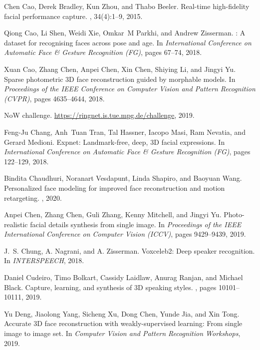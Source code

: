 \documentclass[final]{cvpr}
\begin{document}
{\begin{thebibliography}{10}
Chen Cao, Derek Bradley, Kun Zhou, and Thabo Beeler.
\newblock Real-time high-fidelity facial performance capture.
, 34(4):1--9, 2015.

Qiong Cao, Li Shen, Weidi Xie, Omkar~M Parkhi, and Andrew Zisserman.
: A dataset for recognising faces across pose and age.
\newblock In {\em International Conference on Automatic Face \& Gesture
  Recognition (FG)}, pages 67--74, 2018.

Xuan Cao, Zhang Chen, Anpei Chen, Xin Chen, Shiying Li, and Jingyi Yu.
\newblock Sparse photometric {3D} face reconstruction guided by morphable
  models.
\newblock In {\em Proceedings of the IEEE Conference on Computer Vision and
  Pattern Recognition (CVPR)}, pages 4635--4644, 2018.

NoW challenge.
\newblock \url{https://ringnet.is.tue.mpg.de/challenge}, 2019.

Feng-Ju Chang, Anh~Tuan Tran, Tal Hassner, Iacopo Masi, Ram Nevatia, and Gerard
  Medioni.
\newblock Expnet: Landmark-free, deep, {3D} facial expressions.
\newblock In {\em International Conference on Automatic Face \& Gesture
  Recognition (FG)}, pages 122--129, 2018.

Bindita Chaudhuri, Noranart Vesdapunt, Linda Shapiro, and Baoyuan Wang.
\newblock Personalized face modeling for improved face reconstruction and
  motion retargeting.
, 2020.

Anpei Chen, Zhang Chen, Guli Zhang, Kenny Mitchell, and Jingyi Yu.
\newblock Photo-realistic facial details synthesis from single image.
\newblock In {\em Proceedings of the IEEE International Conference on Computer
  Vision (ICCV)}, pages 9429--9439, 2019.

J.~S. Chung, A. Nagrani, and A. Zisserman.
\newblock Voxceleb2: Deep speaker recognition.
\newblock In {\em INTERSPEECH}, 2018.

Daniel Cudeiro, Timo Bolkart, Cassidy Laidlaw, Anurag Ranjan, and Michael
  Black.
\newblock Capture, learning, and synthesis of {3D} speaking styles.
, pages 10101--10111, 2019.

Yu Deng, Jiaolong Yang, Sicheng Xu, Dong Chen, Yunde Jia, and Xin Tong.
\newblock Accurate {3D} face reconstruction with weakly-supervised learning:
  From single image to image set.
\newblock In {\em Computer Vision and Pattern Recognition Workshops}, 2019.


\end{thebibliography}}
\end{document}
